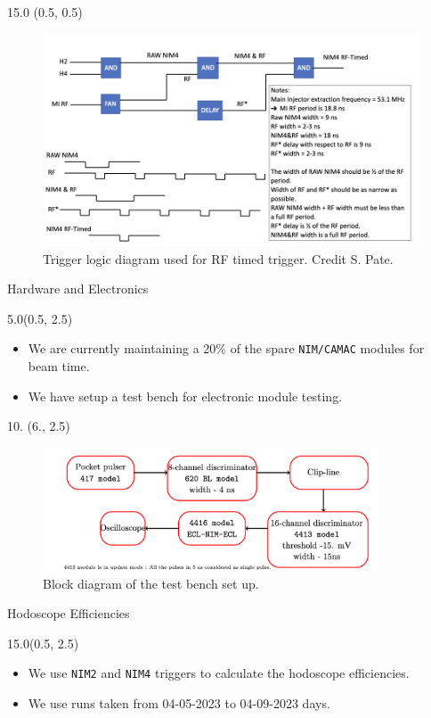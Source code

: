 \documentclass[12pt, xcolor={dvipsnames}, aspectratio = 169, sans,mathserif]{beamer}
\newenvironment{List}[2]
{
\begin{textblock}{#1}#2
\begin{itemize}
}
{
\end{itemize}
\end{textblock}
}
\newenvironment{Pic}[2]
{
\begin{textblock}{#1} #2
\begin{figure}
}
{
\end{figure}
\end{textblock}
}
\begin{document}
\begin{frame}
\begin{Pic}{15.0}{(0.5, 0.5)}
  \includegraphics[width=13.0cm]{imgs/rf_timing.png}
  \caption{Trigger logic diagram used for RF timed trigger. Credit S. Pate.}
\end{Pic}
\end{frame}

\begin{frame}[fragile]{Hardware and Electronics}
\begin{List}{5.0}{(0.5, 2.5)}

  \item We are currently maintaining a 20\% of the spare \verb|NIM/CAMAC|  modules for beam time.

  \item We have setup a test bench for electronic module testing.
\end{List}

\begin{Pic}{10.}{(6., 2.5)}
  \includegraphics[width=10.0cm]{imgs/test_bench.png}
  \caption{Block diagram of the test bench set up.}
\end{Pic}

\end{frame}

\begin{frame}[fragile]{Hodoscope Efficiencies}
\begin{List}{15.0}{(0.5, 2.5)}

  \item We use \verb|NIM2| and \verb|NIM4| triggers to calculate the hodoscope efficiencies.

  \item We use runs taken from 04-05-2023 to 04-09-2023 days.

\end{List}
\end{frame}
\end{document}
